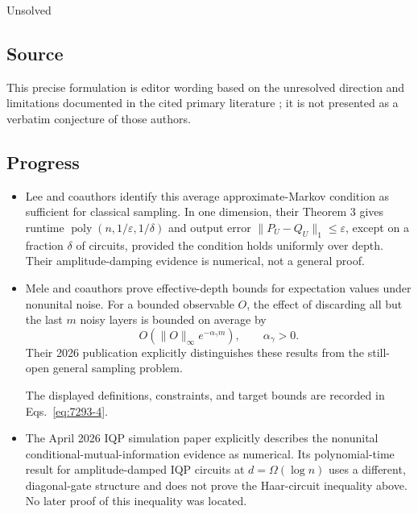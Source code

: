 Unsolved

\subsection*{Source}

This precise formulation is editor wording based on the unresolved direction and limitations documented in the cited primary literature ; it is not presented as a verbatim conjecture of those authors.

\subsection*{Progress}

\begin{itemize}
  \item Lee and coauthors identify this average approximate-Markov condition as sufficient for classical sampling. In one dimension, their Theorem 3 gives runtime $\operatorname{poly}(n,1/\varepsilon,1/\delta)$ and output error $\|P_U-Q_U\|_1\leq\varepsilon$, except on a fraction $\delta$ of circuits, provided the condition holds uniformly over depth. Their amplitude-damping evidence is numerical, not a general proof. 

  \item Mele and coauthors prove effective-depth bounds for expectation values under nonunital noise. For a bounded observable $O$, the effect of discarding all but the last $m$ noisy layers is bounded on average by
  \begin{equation}
O\!\left(\|O\|_\infty e^{-\alpha_\gamma m}\right),
  \qquad \alpha_\gamma>0.
\label{eq:7293-4}
\end{equation}
  Their 2026 publication explicitly distinguishes these results from the still-open general sampling problem. 

The displayed definitions, constraints, and target bounds are recorded in Eqs.~\eqref{eq:7293-4}.

  \item The April 2026 IQP simulation paper explicitly describes the nonunital conditional-mutual-information evidence as numerical. Its polynomial-time result for amplitude-damped IQP circuits at $d=\Omega(\log n)$ uses a different, diagonal-gate structure and does not prove the Haar-circuit inequality above. No later proof of this inequality was located. 
\end{itemize}

